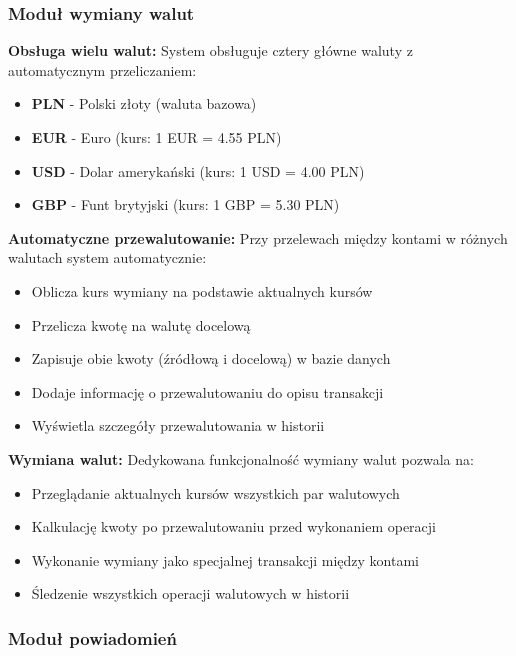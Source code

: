 \documentclass[12pt,a4paper]{article}
\begin{document}
    \subsubsection{Moduł wymiany walut}

    \textbf{Obsługa wielu walut:}
    System obsługuje cztery główne waluty z automatycznym przeliczaniem:
    \begin{itemize}
        \item \textbf{PLN} - Polski złoty (waluta bazowa)
        \item \textbf{EUR} - Euro (kurs: 1 EUR = 4.55 PLN)
        \item \textbf{USD} - Dolar amerykański (kurs: 1 USD = 4.00 PLN)
        \item \textbf{GBP} - Funt brytyjski (kurs: 1 GBP = 5.30 PLN)
    \end{itemize}

    \textbf{Automatyczne przewalutowanie:}
    Przy przelewach między kontami w różnych walutach system automatycznie:
    \begin{itemize}
        \item Oblicza kurs wymiany na podstawie aktualnych kursów
        \item Przelicza kwotę na walutę docelową
        \item Zapisuje obie kwoty (źródłową i docelową) w bazie danych
        \item Dodaje informację o przewalutowaniu do opisu transakcji
        \item Wyświetla szczegóły przewalutowania w historii
    \end{itemize}

    \textbf{Wymiana walut:}
    Dedykowana funkcjonalność wymiany walut pozwala na:
    \begin{itemize}
        \item Przeglądanie aktualnych kursów wszystkich par walutowych
        \item Kalkulację kwoty po przewalutowaniu przed wykonaniem operacji
        \item Wykonanie wymiany jako specjalnej transakcji między kontami
        \item Śledzenie wszystkich operacji walutowych w historii
    \end{itemize}

    \subsubsection{Moduł powiadomień}
\end{document}
